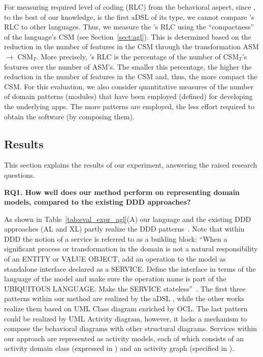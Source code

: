 For measuring required level of coding (RLC) from the behavioral aspect, since \agl, to the best of our knowledge, is the first aDSL of its type, we cannot compare \agl's RLC to other languages. Thus, we measure the \agl's RLC using the ``compactness'' of the language's CSM (see Section~\ref{sect:agl}). This is determined based on the reduction in the number of features in the CSM through the transformation ASM $\rightarrow$ CSM$_T$. More precisely, \agl's RLC is the percentage of the number of CSM$_T$'s features over the number of ASM's. The smaller this percentage, the higher the reduction in the number of features in the CSM and, thus, the more compact the CSM. For this evaluation, we also consider quantitative measures of the number of domain patterns (modules) that have been employed (defined) for developing the underlying apps. The more patterns are employed, the less effort required to obtain the software (by composing them).

\subsection{Results}
\label{subsect:results} 

This section explains the results of our experiment, answering the raised research questions.

\label{sect:eval-expressiveness}

\noindent \textbf{RQ1. How well does our method perform on representing domain models, compared to the existing DDD approaches?}	

As shown in Table~\ref{tab:eval_expr_agl}(A) our language and the existing DDD approaches (AL and XL) partly realize the DDD patterns~\cite{evans_domain-driven_2004}. Note that within DDD the notion of a service is referred to as a building block: ``When a significant process or transformation in the domain is not a natural responsibility of an ENTITY or VALUE OBJECT, add an operation to the model as standalone interface declared as a SERVICE. Define the interface in terms of the language of the model and make sure the operation name is part of the UBIQUITOUS LANGUAGE. Make the SERVICE stateless''~\cite{evans_domain-driven_2004}. The first three patterns within our method are realized by the aDSL \dcsl, while the other works realize them based on UML Class diagram enriched by OCL. The last pattern could be realized by UML Activity diagram, however, it lacks a mechanism to compose the behavioral diagrams with other structural diagrams. Services within our approach are represented as activity models, each of which consists of an activity domain class (expressed in \dcsl) and an activity graph (specified in \agl).

